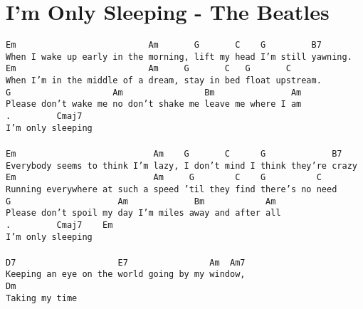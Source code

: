 \newpage
\section{I'm Only Sleeping - The Beatles}
\label{I'm Only Sleeping - The Beatles}
\texttt{Em\ \ \ \ \ \ \ \ \ \ \ \ \ \ \ \ \ \ \ \ \ \ \ \ \ \ Am\ \ \ \ \ \ \ G\ \ \ \ \ \ \ C\ \ \ \ G\ \ \ \ \ \ \ \ \ B7\\
When\ I\ wake\ up\ early\ in\ the\ morning,\ lift\ my\ head\ I'm\ still\ yawning.\\
Em\ \ \ \ \ \ \ \ \ \ \ \ \ \ \ \ \ \ \ \ \ \ \ \ \ \ Am\ \ \ \ \ G\ \ \ \ \ \ \ C\ \ \ G\ \ \ \ \ \ \ C\\
When\ I'm\ in\ the\ middle\ of\ a\ dream,\ stay\ in\ bed\ float\ upstream.\\
G\ \ \ \ \ \ \ \ \ \ \ \ \ \ \ \ \ \ \ \ Am\ \ \ \ \ \ \ \ \ \ \ \ \ \ \ \ Bm\ \ \ \ \ \ \ \ \ \ \ \ \ \ \ Am\\
Please\ don't\ wake\ me\ no\ don't\ shake\ me\ leave\ me\ where\ I\ am\\
.\ \ \ \ \ \ \ \ \ Cmaj7\\
I'm\ only\ sleeping\\
\\
Em\ \ \ \ \ \ \ \ \ \ \ \ \ \ \ \ \ \ \ \ \ \ \ \ \ \ \ Am\ \ \ \ G\ \ \ \ \ \ \ C\ \ \ \ \ \ G\ \ \ \ \ \ \ \ \ \ \ \ \ B7\\
Everybody\ seems\ to\ think\ I'm\ lazy,\ I\ don't\ mind\ I\ think\ they're\ crazy\\
Em\ \ \ \ \ \ \ \ \ \ \ \ \ \ \ \ \ \ \ \ \ \ \ \ \ \ \ Am\ \ \ \ \ G\ \ \ \ \ \ \ \ C\ \ \ \ G\ \ \ \ \ \ \ \ \ \ C\\
Running\ everywhere\ at\ such\ a\ speed\ 'til\ they\ find\ there's\ no\ need\\
G\ \ \ \ \ \ \ \ \ \ \ \ \ \ \ \ \ \ \ \ \ Am\ \ \ \ \ \ \ \ \ \ \ \ \ Bm\ \ \ \ \ \ \ \ \ \ \ \ Am\\
Please\ don't\ spoil\ my\ day\ I'm\ miles\ away\ and\ after\ all\\
.\ \ \ \ \ \ \ \ \ Cmaj7\ \ \ \ Em\\
I'm\ only\ sleeping\\
\\
D7\ \ \ \ \ \ \ \ \ \ \ \ \ \ \ \ \ \ \ \ E7\ \ \ \ \ \ \ \ \ \ \ \ \ \ \ \ Am\ \ Am7\\
Keeping\ an\ eye\ on\ the\ world\ going\ by\ my\ window,\\
Dm\\
Taking\ my\ time\\
\\
}
